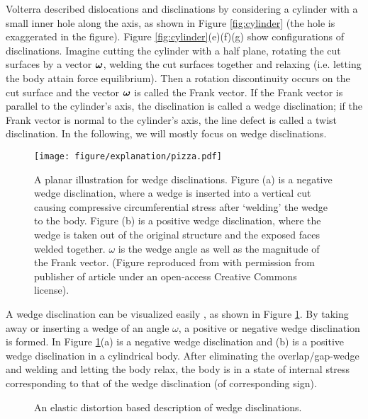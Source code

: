 \documentclass[11pt,letterpaper]{article}
\begin{document}
Volterra \cite{nabarro1985development} described dislocations and disclinations by considering a cylinder with a small inner hole along the axis, as shown in Figure \ref{fig:cylinder} (the hole is exaggerated in the figure). Figure \ref{fig:cylinder}(e)(f)(g) show configurations of disclinations. Imagine cutting the cylinder with a half plane, rotating the cut surfaces by a vector $\bfomega$, welding the cut surfaces together and relaxing (i.e. letting the body attain force equilibrium). Then a rotation discontinuity occurs on the cut surface and the vector $\bfomega$ is called the Frank vector. If the Frank vector is parallel to the cylinder's axis, the disclination is called a wedge disclination; if the Frank vector is normal to the cylinder's axis, the line defect is called a twist disclination. In the following, we will mostly focus on wedge disclinations.

\begin {figure}%
\centering
\texttt{[image: figure/explanation/pizza.pdf]}
\caption{A planar illustration for wedge disclinations. Figure (a) is a negative wedge disclination, where a wedge is inserted into a vertical cut causing compressive circumferential stress after `welding' the wedge to the body. Figure (b) is a positive wedge disclination, where the wedge is taken out of the original structure and the exposed faces welded together. $\omega$ is the wedge angle as well as the magnitude of the Frank vector. (Figure reproduced from \cite{nazarov2013disclinations} with permission from publisher of article under an open-access Creative Commons license).}\label{fig:pizza}
\end {figure}

A wedge disclination can be visualized easily \cite{nazarov2013disclinations}, as shown in Figure \ref{fig:pizza}. By taking away or inserting a wedge of an angle $\omega$, a positive or negative wedge disclination is formed. In Figure \ref{fig:pizza}(a) is a negative wedge disclination and (b) is a positive wedge disclination in a cylindrical body. After eliminating the overlap/gap-wedge and welding and letting the body relax, the body is in a state of internal stress corresponding to that of the wedge disclination (of corresponding sign). 

\begin {figure}%
\centering
{}\qquad
{}
\caption{An elastic distortion based description of wedge disclinations.}\label{fig:single_disclination}
\end {figure}
\end{document}
